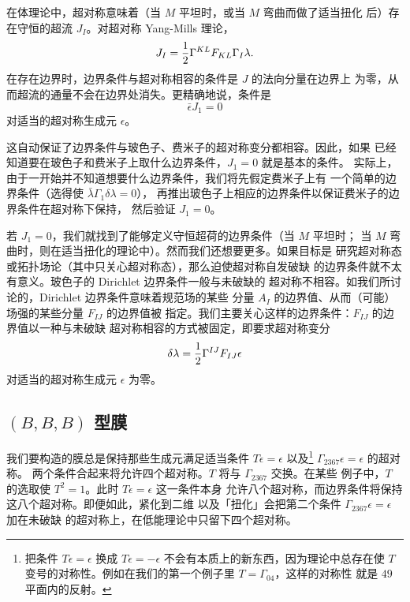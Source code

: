 在体理论中，超对称意味着（当 $M$ 平坦时，或当 $M$ 弯曲而做了适当扭化
后）存在守恒的超流 $J_I$。对超对称 Yang-Mills 理论，
\setcounter{equation}{5}
\begin{equation}\label{eq:noggin}
J_I={1\over 2}{\Gamma}^{KL}F_{KL}{\Gamma}_I\lambda.
\end{equation}
 在存在边界时，边界条件与超对称相容的条件是 $J$ 的法向分量在边界上
为零，从而超流的通量不会在边界处消失。更精确地说，条件是 %
\setcounter{equation}{6}
\begin{equation}\label{eq:hobbo}
\bar \epsilon J_1=0
\end{equation}
 对适当的超对称生成元 $\epsilon$。

这自动保证了边界条件与玻色子、费米子的超对称变分都相容。因此，如果
已经知道要在玻色子和费米子上取什么边界条件，$J_1=0$ 就是基本的条件。
实际上，由于一开始并不知道想要什么边界条件，我们将先假定费米子上有
一个简单的边界条件（选得使 ${\bar \lambda}\Gamma_1\delta\lambda=0$），
再推出玻色子上相应的边界条件以保证费米子的边界条件在超对称下保持，
然后验证 $J_1=0$。

若 $J_1=0$，我们就找到了能够定义守恒超荷的边界条件（当 $M$ 平坦时；
当 $M$ 弯曲时，则在适当扭化的理论中）。然而我们还想要更多。如果目标是
研究超对称态或拓扑场论（其中只关心超对称态），那么迫使超对称自发破缺
的边界条件就不太有意义。玻色子的 Dirichlet 边界条件一般与未破缺的
超对称不相容。如我们所讨论的，Dirichlet 边界条件意味着规范场的某些
分量 $A_I$ 的边界值、从而（可能）场强的某些分量 $F_{IJ}$ 的边界值被
指定。我们主要关心这样的边界条件：$F_{IJ}$ 的边界值以一种与未破缺
超对称相容的方式被固定，即要求超对称变分
\setcounter{equation}{7}
\begin{equation}\label{eq:undop}
\delta\lambda =\frac{1}{2}{\Gamma}^{IJ}F_{IJ}\epsilon
\end{equation}
 对适当的超对称生成元 $\epsilon$ 为零。

\subsection{$(B,B,B)$ 型膜}

我们要构造的膜总是保持那些生成元满足适当条件 $T\epsilon=\epsilon$
以及\footnote{把条件 $T\epsilon=\epsilon$ 换成
$T\epsilon=-\epsilon$ 不会有本质上的新东西，因为理论中总存在使 $T$
变号的对称性。例如在我们的第一个例子里 $T=\Gamma_{04}$，这样的对称性
就是 $49$ 平面内的反射。} $\Gamma_{2367}\epsilon=\epsilon$ 的超对称。
两个条件合起来将允许四个超对称。$T$ 将与 $\Gamma_{2367}$ 交换。在某些
例子中，$T$ 的选取使 $T^2=1$。此时 $T\epsilon=\epsilon$ 这一条件本身
允许八个超对称，而边界条件将保持这八个超对称。即便如此，紧化到二维
以及「扭化」会把第二个条件 $\Gamma_{2367}\epsilon=\epsilon$ 加在未破缺
的超对称上，在低能理论中只留下四个超对称。

